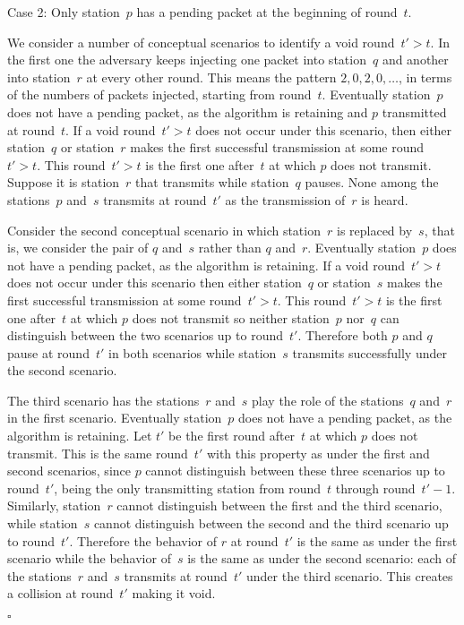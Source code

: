 \documentclass[11pt]{article}
\newcommand{\qed}{\hfill $\square$ \smallbreak}
\newenvironment{proof}{\noindent{\bf Proof:}}{\qed}
\begin{document}
\begin{proof}
\noindent
\textsf{Case 2:} Only station~$p$ has a pending packet at the beginning of round~$t$.


We consider a number of conceptual scenarios to identify a void round~$t'>t$.
In the first one the adversary keeps injecting one packet into station~$q$ and another into station~$r$ at every other round.
This means the pattern $2,0,2,0,\ldots$, in terms of the numbers of packets injected, starting from round~$t$.
Eventually station~$p$ does not have a pending packet, as the algorithm is retaining and $p$ transmitted at round~$t$.
If a void round~$t'>t$ does not occur under this scenario, then either station~$q$ or station~$r$ makes the first successful transmission at some round~$t'>t$.
This round~$t'>t$ is the first one after~$t$ at which $p$ does not transmit.
Suppose it is station~$r$ that transmits while station~$q$ pauses.
None among the stations~$p$ and~$s$ transmits at round~$t'$ as the transmission of~$r$ is heard. 

Consider the second conceptual scenario in which station~$r$ is replaced by~$s$, that is, we consider the pair of $q$ and~$s$ rather than $q$ and~$r$.
Eventually station~$p$ does not have a pending packet, as the algorithm is retaining.
If a void round~$t'>t$ does not occur under this scenario then either station~$q$ or station~$s$ makes the first successful transmission at some round~$t'>t$.
This round~$t'>t$ is the first one after~$t$ at which $p$ does not transmit so neither station~$p$ nor~$q$ can distinguish between the two scenarios up to round~$t'$.
Therefore both $p$ and $q$ pause at round~$t'$ in both scenarios while station~$s$ transmits successfully under the second scenario.

The third scenario has the stations~$r$ and~$s$ play the role of the stations~$q$ and~$r$ in the first scenario.
Eventually station~$p$ does not have a pending packet, as the algorithm is retaining.
Let $t'$ be the first round after~$t$ at which $p$ does not transmit.
This is the same round~$t'$ with this property as under the first and second scenarios, since $p$ cannot distinguish between these three scenarios up to round~$t'$, being the only transmitting station from round~$t$ through round~$t'-1$.
Similarly, station~$r$ cannot distinguish between the first and the third scenario, while station~$s$ cannot distinguish between the second and the third scenario up to round~$t'$.
Therefore the behavior of $r$ at round~$t'$ is the same as under the first scenario while the behavior of~$s$ is the same as under the second scenario: each of the stations~$r$ and~$s$ transmits at round~$t'$ under the third scenario.
This creates a collision at round~$t'$ making it void.


\end{proof}
\end{document}
